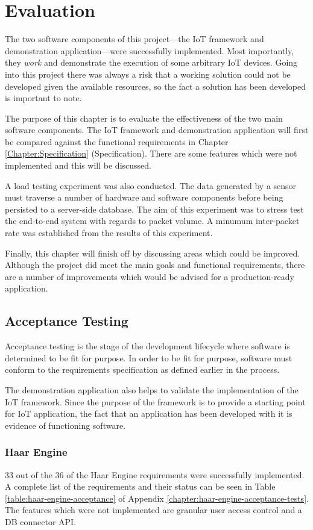 \chapter{Evaluation}
  The two software components of this project---the IoT framework and demonstration application---were successfully implemented. Most importantly, they \textit{work} and demonstrate the execution of some arbitrary IoT devices. Going into this project there was always a risk that a working solution could not be developed given the available resources, so the fact a solution has been developed is important to note. 

  The purpose of this chapter is to evaluate the effectiveness of the two main software components. The IoT framework and demonstration application will first be compared against the functional requirements in Chapter \ref{Chapter:Specification} (Specification). There are some features which were not implemented and this will be discussed.

  A load testing experiment was also conducted. The data generated by a sensor must traverse a number of hardware and software components before being persisted to a server-side database. The aim of this experiment was to stress test the end-to-end system with regards to packet volume. A minumum inter-packet rate was established from the results of this experiment.

  Finally, this chapter will finish off by discussing areas which could be improved. Although the project did meet the main goals and functional requirements, there are a number of improvements which would be advised for a production-ready application.

  \section{Acceptance Testing}
    Acceptance testing is the stage of the development lifecycle where software is determined to be fit for purpose. In order to be fit for purpose, software must conform to the requirements specification as defined earlier in the process.

    The demonstration application also helps to validate the implementation of the IoT framework. Since the purpose of the framework is to provide a starting point for IoT application, the fact that an application has been developed with it is evidence of functioning software.

    \subsection{Haar Engine}
      33 out of the 36 of the Haar Engine requirements were successfully implemented. A complete list of the requirements and their status can be seen in Table \ref{table:haar-engine-acceptance} of Appendix \ref{chapter:haar-engine-acceptance-tests}. The features which were not implemented are granular user access control and a DB connector API.

